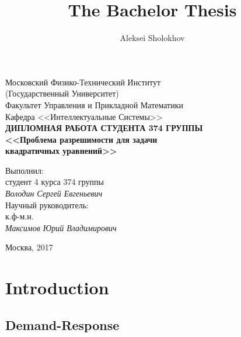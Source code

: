 \documentclass[a4paper]{article}
\author{Aleksei Sholokhov}
\title{The Bachelor Thesis}
\begin{document}
	\begin{titlepage}
		\begin{center}
			Московский Физико-Технический Институт\\
			(Государственный Университет)\\
			
			\bigskip
			Факультет Управления и Прикладной Математики\\
			Кафедра <<Интеллектуальные Системы>>\\[10mm]
			
			\textsf{\large\bfseries
				ДИПЛОМНАЯ РАБОТА СТУДЕНТА 374 ГРУППЫ\\[10mm]
				<<Проблема разрешимости для задачи\\ квадратичных
				уравнений>>
			}\\[10mm]
			
			\begin{flushright}
				\parbox{0.5\textwidth}{
					Выполнил:\\
					студент 4 курса 374 группы\\
					\emph{Володин Сергей Евгеньевич}\\[5mm]
					Научный руководитель:\\
					к.ф-м.н.\\
					\emph{Максимов Юрий Владимирович}
				}
			\end{flushright}
			
			\vspace{\fill}
			Москва, 2017
		\end{center}
	\end{titlepage}
	

\section{Introduction}
\subsection{Demand-Response}
\end{document}
